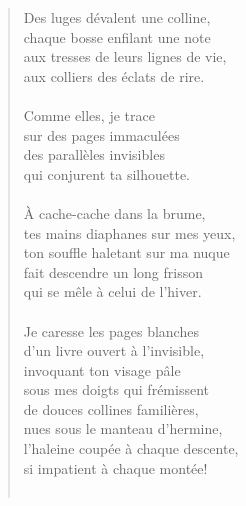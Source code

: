 \documentclass[11pt,a4paper]{book}
\begin{document}
\begin{verse}
  Des luges dévalent une colline, \\
  chaque bosse enfilant une note \\
  aux tresses de leurs lignes de vie, \\
  aux colliers des éclats de rire. \\
  \ \\
  Comme elles, je trace \\
  sur des pages immaculées \\
  des parallèles invisibles \\
  qui conjurent ta silhouette. \\
  \ \\
  À cache-cache dans la brume, \\
  tes mains diaphanes sur mes yeux, \\
  ton souffle haletant sur ma nuque \\
  fait descendre un long frisson \\
  qui se mêle à celui de l'hiver. \\
  \ \\
  Je caresse les pages blanches \\
  d'un livre ouvert à l'invisible, \\
  invoquant ton visage pâle \\
  sous mes doigts qui frémissent \\
  de douces collines familières, \\
  nues sous le manteau d'hermine, \\
  l'haleine coupée à chaque descente, \\
  si impatient à chaque montée! \\
  \ \\



\end{verse}
\end{document}
